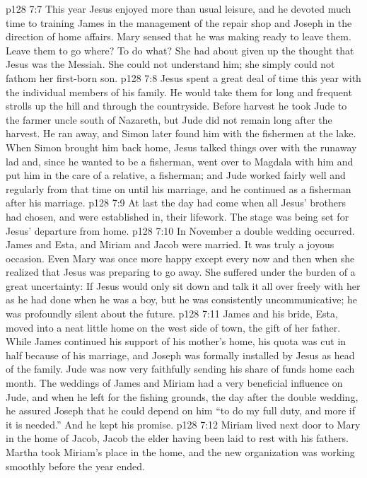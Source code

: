 \pc \vs p128 7:7 This year Jesus enjoyed more than usual leisure, and he devoted much time to training James in the management of the repair shop and Joseph in the direction of home affairs. Mary sensed that he was making ready to leave them. Leave them to go where? To do what? She had about given up the thought that Jesus was the Messiah. She could not understand him; she simply could not fathom her first\hyp{}born son.
\vs p128 7:8 Jesus spent a great deal of time this year with the individual members of his family. He would take them for long and frequent strolls up the hill and through the countryside. Before harvest he took Jude to the farmer uncle south of Nazareth, but Jude did not remain long after the harvest. He ran away, and Simon later found him with the fishermen at the lake. When Simon brought him back home, Jesus talked things over with the runaway lad and, since he wanted to be a fisherman, went over to Magdala with him and put him in the care of a relative, a fisherman; and Jude worked fairly well and regularly from that time on until his marriage, and he continued as a fisherman after his marriage.
\pc \vs p128 7:9 At last the day had come when all Jesus’ brothers had chosen, and were established in, their lifework. The stage was being set for Jesus’ departure from home.
\pc \vs p128 7:10 In November a double wedding occurred. James and Esta, and Miriam and Jacob were married. It was truly a joyous occasion. Even Mary was once more happy except every now and then when she realized that Jesus was preparing to go away. She suffered under the burden of a great uncertainty: If Jesus would only sit down and talk it all over freely with her as he had done when he was a boy, but he was consistently uncommunicative; he was profoundly silent about the future.
\vs p128 7:11 James and his bride, Esta, moved into a neat little home on the west side of town, the gift of her father. While James continued his support of his mother’s home, his quota was cut in half because of his marriage, and Joseph was formally installed by Jesus as head of the family. Jude was now very faithfully sending his share of funds home each month. The weddings of James and Miriam had a very beneficial influence on Jude, and when he left for the fishing grounds, the day after the double wedding, he assured Joseph that he could depend on him “to do my full duty, and more if it is needed.” And he kept his promise.
\vs p128 7:12 Miriam lived next door to Mary in the home of Jacob, Jacob the elder having been laid to rest with his fathers. Martha took Miriam’s place in the home, and the new organization was working smoothly before the year ended.
